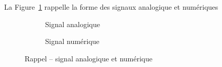 La Figure~\ref{fig:analogVsNum} rappelle la forme des signaux analogique et numériques

\begin{figure}[ht]
\centering
\begin{subfigure}{0.49\textwidth}
\centering
	
	\caption{Signal analogique}
\end{subfigure}%
%
\begin{subfigure}{0.49\textwidth}
\centering
	
	\caption{Signal numérique}
\end{subfigure}
%
	\caption{Rappel -- signal analogique et numérique}
	\label{fig:analogVsNum}
\end{figure}


